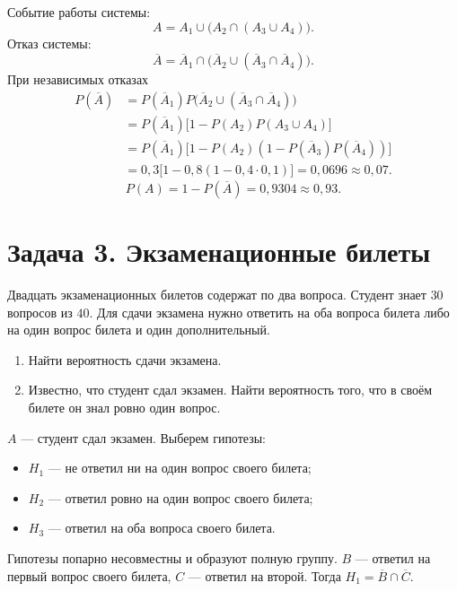 Событие работы системы:
\[
 A=A_1\cup\bigl(A_2\cap(A_3\cup A_4)\bigr).
\]
Отказ системы:
\[
 \overline A=\overline A_1\cap
 \bigl(\overline A_2\cup(\overline A_3\cap\overline A_4)\bigr).
\]
При независимых отказах
\begin{align*}
 P(\overline A)
 &=P(\overline A_1)P\bigl(\overline A_2\cup(\overline A_3\cap\overline A_4)\bigr)\\
 &=P(\overline A_1)\bigl[1-P(A_2)P(A_3\cup A_4)\bigr]\\
 &=P(\overline A_1)\bigl[1-P(A_2)
 (1-P(\overline A_3)P(\overline A_4))\bigr]\\
 &=0{,}3\bigl[1-0{,}8(1-0{,}4\cdot0{,}1)\bigr]
 =0{,}0696\approx0{,}07.
\end{align*}
\[
 P(A)=1-P(\overline A)=0{,}9304\approx0{,}93.
\]

\section*{Задача 3. Экзаменационные билеты}
Двадцать экзаменационных билетов содержат по два вопроса.
Студент знает $30$ вопросов из $40$. Для сдачи экзамена нужно ответить
на оба вопроса билета либо на один вопрос билета и один дополнительный.
\begin{enumerate}
 \item Найти вероятность сдачи экзамена.
 \item Известно, что студент сдал экзамен. Найти вероятность того,
 что в своём билете он знал ровно один вопрос.
\end{enumerate}
$A$ --- студент сдал экзамен. Выберем гипотезы:
\begin{itemize}
 \item $H_1$ --- не ответил ни на один вопрос своего билета;
 \item $H_2$ --- ответил ровно на один вопрос своего билета;
 \item $H_3$ --- ответил на оба вопроса своего билета.
\end{itemize}
Гипотезы попарно несовместны и образуют полную группу.
$B$ --- ответил на первый вопрос своего билета,
$C$ --- ответил на второй. Тогда $H_1=\overline B\cap\overline C$.

